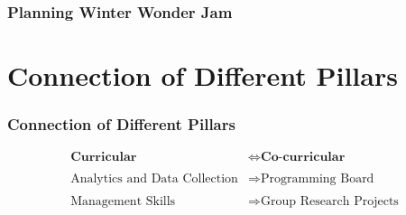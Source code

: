 \documentclass{beamer}
\begin{document}
\begin{frame}
\frametitle{Planning Winter Wonder Jam}
\begin{figure}[htp]
	\centering
	\quad
\end{figure}
\end{frame}


\section{Connection of Different Pillars}

\begin{frame}
\frametitle{Connection of Different Pillars}
\begin{equation*} \begin{split} 
	\textbf{Curricular} &\iff \textbf{Co-curricular} \\
	\\
	\text{Analytics and Data Collection} &\Longrightarrow \text{Programming Board} \\
	\\
	\text{Management Skills} &\Longrightarrow \text{Group Research Projects}
\end{split} \end{equation*}
\end{frame}
\end{document}
